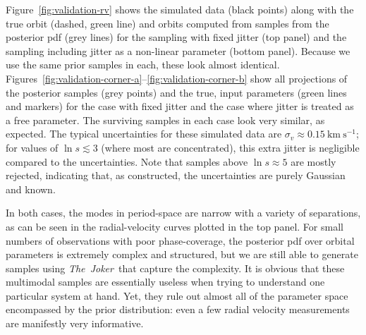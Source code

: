 \documentclass[manuscript, letterpaper]{aastex6}
\newcommand{\project}[1]{\textsl{#1}}
\newcommand{\samplername}{\project{The~Joker}}
\newcommand{\figname}{Figure}
\newcommand{\kms}{\mathrm{km}~\mathrm{s}^{-1}}
\begin{document}
\figname~\ref{fig:validation-rv} shows the simulated data (black points) along with
the true orbit (dashed, green line) and orbits computed from samples from the
posterior pdf (grey lines) for the sampling with fixed jitter (top panel) and
the sampling including jitter as a non-linear parameter (bottom panel).
Because we use the same prior samples in each, these look almost identical.
\figname s~\ref{fig:validation-corner-a}--\ref{fig:validation-corner-b} show all
projections of the posterior samples (grey points) and the true, input
parameters (green lines and markers) for the case with fixed jitter and the case
where jitter is treated as a free parameter.
The surviving samples in each case look very similar, as expected.
The typical uncertainties for these simulated data are $\sigma_v \approx
0.15~\kms$; for values of $\ln s \lesssim 3$ (where most are concentrated), this
extra jitter is negligible compared to the uncertainties.
Note that samples above $\ln s \approx 5$ are mostly rejected, indicating that,
as constructed, the uncertainties are purely Gaussian and known.

In both cases, the modes in period-space are narrow with a variety of
separations, as can be seen in the radial-velocity curves plotted in the top
panel.
For small numbers of observations with poor phase-coverage, the posterior pdf
over orbital parameters is extremely complex and structured, but we are still
able to generate samples using \samplername\ that capture the complexity.
It is obvious that these multimodal samples are essentially useless when
trying to understand one particular system at hand. Yet, they rule out almost
all of the parameter space encompassed by the prior distribution:
even a few radial velocity measurements are manifestly very informative.
\end{document}
